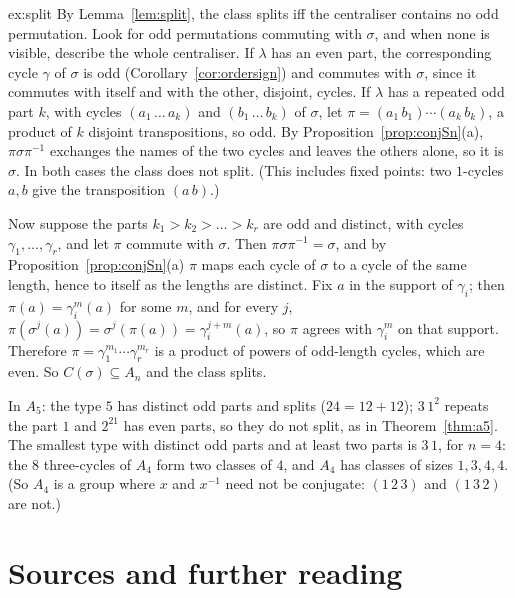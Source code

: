 \begin{solution}{ex:split}
\idea By Lemma~\ref{lem:split}, the class splits iff the centraliser contains no odd permutation. Look for odd permutations commuting with $\sigma$, and when none is visible, describe the whole centraliser.
\writeup If $\lambda$ has an even part, the corresponding cycle $\gamma$ of $\sigma$ is odd (Corollary~\ref{cor:ordersign}) and commutes with $\sigma$, since it commutes with itself and with the other, disjoint, cycles. If $\lambda$ has a repeated odd part $k$, with cycles $(a_1\,\dots\,a_k)$ and $(b_1\,\dots\,b_k)$ of $\sigma$, let $\pi=(a_1\,b_1)\cdots(a_k\,b_k)$, a product of $k$ disjoint transpositions, so odd. By Proposition~\ref{prop:conjSn}(a), $\pi\sigma\pi^{-1}$ exchanges the names of the two cycles and leaves the others alone, so it is $\sigma$. In both cases the class does not split. (This includes fixed points: two $1$-cycles $a,b$ give the transposition $(a\,b)$.)

Now suppose the parts $k_1>k_2>\dots>k_r$ are odd and distinct, with cycles $\gamma_1,\dots,\gamma_r$, and let $\pi$ commute with $\sigma$. Then $\pi\sigma\pi^{-1}=\sigma$, and by Proposition~\ref{prop:conjSn}(a) $\pi$ maps each cycle of $\sigma$ to a cycle of the same length, hence to itself as the lengths are distinct. Fix $a$ in the support of $\gamma_i$; then $\pi(a)=\gamma_i^m(a)$ for some $m$, and for every $j$, $\pi(\sigma^j(a))=\sigma^j(\pi(a))=\gamma_i^{j+m}(a)$, so $\pi$ agrees with $\gamma_i^m$ on that support. Therefore $\pi=\gamma_1^{m_1}\cdots\gamma_r^{m_r}$ is a product of powers of odd-length cycles, which are even. So $C(\sigma)\subseteq A_n$ and the class splits.

In $A_5$: the type $5$ has distinct odd parts and splits ($24=12+12$); $3\,1^2$ repeats the part $1$ and $2^21$ has even parts, so they do not split, as in Theorem~\ref{thm:a5}. The smallest type with distinct odd parts and at least two parts is $3\,1$, for $n=4$: the $8$ three-cycles of $A_4$ form two classes of $4$, and $A_4$ has classes of sizes $1,3,4,4$. (So $A_4$ is a group where $x$ and $x^{-1}$ need not be conjugate: $(1\,2\,3)$ and $(1\,3\,2)$ are not.)
\end{solution}

\section*{Sources and further reading}

